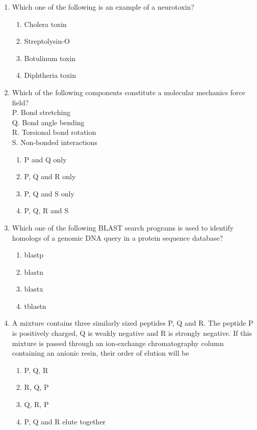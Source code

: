 \documentclass[journal,12pt,onecolumn]{IEEEtran}
\theoremstyle{remark}
\begin{document}
\begin{enumerate}
    \item Which one of the following is an example of a neurotoxin?
    
    \begin{enumerate}
        \item Cholera toxin
        \item Streptolysin-O
        \item Botulinum toxin
        \item Diphtheria toxin
    \end{enumerate}
    

    \item Which of the following components constitute a molecular mechanics force field?\\
    P. Bond stretching\\
    Q. Bond angle bending\\
    R. Torsional bond rotation\\
    S. Non-bonded interactions
   
    \begin{enumerate}
        \item P and Q only
        \item P, Q and R only
        \item P, Q and S only
        \item P, Q, R and S
    \end{enumerate}
    

    \item Which one of the following BLAST search programs is used to identify homologs of a genomic DNA query in a protein sequence database?
    \begin{multicols}{4}
    \begin{enumerate}
        \item blastp
        \item blastn
        \item blastx
        \item tblastn
    \end{enumerate}
    \end{multicols}
 \item A mixture contains three similarly sized peptides P, Q and R. The peptide P is positively charged, Q is weakly negative and R is strongly negative. If this mixture is passed through an ion-exchange chromatography column containing an anionic resin, their order of elution will be
    \begin{multicols}{2}
    \begin{enumerate}
        \item P, Q, R
        \item R, Q, P
        \item Q, R, P
        \item P, Q and R elute together
    \end{enumerate}
    \end{multicols}


\end{enumerate}
\end{document}
